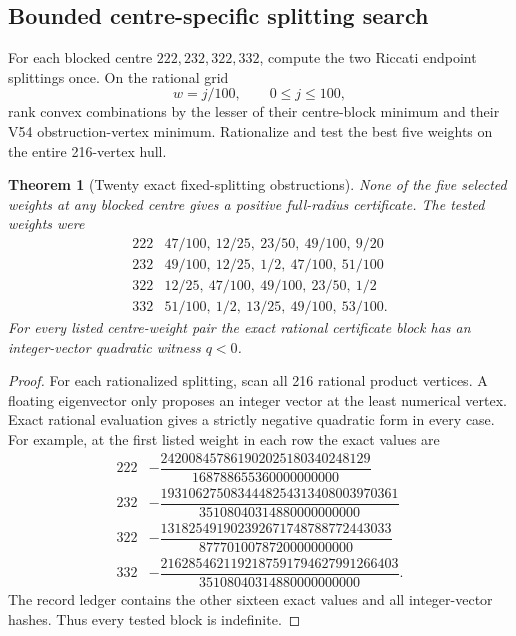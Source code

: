 \documentclass[11pt,oneside]{article}
\newtheorem{theorem}{Theorem}[section]
\theoremstyle{definition}
\theoremstyle{remark}
\begin{document}
\subsection{Bounded centre-specific splitting search}

For each blocked centre \(222,232,322,332\), compute the two
Riccati endpoint splittings once.  On the rational grid
\[
 w=j/100,\qquad0\le j\le100,                          \tag{55.7}
\]
rank convex combinations by the lesser of their centre-block
minimum and their V54 obstruction-vertex minimum.  Rationalize and
test the best five weights on the entire 216-vertex hull.

\begin{theorem}[Twenty exact fixed-splitting obstructions]
\label{thm:newv55-weight-obstructions}
None of the five selected weights at any blocked centre gives a
positive full-radius certificate.  The tested weights were
\[
\begin{array}{c|l}
222&47/100,\ 12/25,\ 23/50,\ 49/100,\ 9/20\\
232&49/100,\ 12/25,\ 1/2,\ 47/100,\ 51/100\\
322&12/25,\ 47/100,\ 49/100,\ 23/50,\ 1/2\\
332&51/100,\ 1/2,\ 13/25,\ 49/100,\ 53/100.
\end{array}                                             \tag{55.8}
\]
For every listed centre-weight pair the exact rational certificate
block has an integer-vector quadratic witness \(q<0\).
\end{theorem}

\begin{proof}
For each rationalized splitting, scan all 216 rational product
vertices.  A floating eigenvector only proposes an integer vector
at the least numerical vertex.  Exact rational evaluation gives a
strictly negative quadratic form in every case.  For example, at
the first listed weight in each row the exact values are
\[
\begin{array}{c|c}
222&-\dfrac{242008457861902025180340248129}
{168788655360000000000}\\[5pt]
232&-\dfrac{1931062750834448254313408003970361}
{35108040314880000000000}\\[5pt]
322&-\dfrac{131825491902392671748788772443033}
{8777010078720000000000}\\[5pt]
332&-\dfrac{2162854621192187591794627991266403}
{35108040314880000000000}.
\end{array}                                             \tag{55.9}
\]
The record ledger contains the other sixteen exact values and all
integer-vector hashes.  Thus every tested block is indefinite.
\end{proof}
\end{document}
